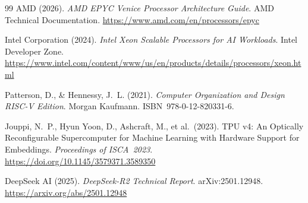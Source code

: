 ﻿\documentclass[a4paper,12pt]{article}
\theoremstyle{definition}
\begin{document}
\begin{thebibliography}{99}
AMD (2026).
\textit{AMD EPYC Venice Processor Architecture Guide}.
AMD Technical Documentation.
\url{https://www.amd.com/en/processors/epyc}

Intel Corporation (2024).
\textit{Intel Xeon Scalable Processors for AI Workloads}.
Intel Developer Zone.
\url{https://www.intel.com/content/www/us/en/products/details/processors/xeon.html}

Patterson, D., \& Hennessy, J.~L. (2021).
\textit{Computer Organization and Design RISC-V Edition}.
Morgan Kaufmann. ISBN~978-0-12-820331-6.

Jouppi, N.~P., Hyun Yoon, D., Ashcraft, M., et al.\ (2023).
TPU v4: An Optically Reconfigurable Supercomputer for Machine Learning
with Hardware Support for Embeddings.
\textit{Proceedings of ISCA~2023}.
\url{https://doi.org/10.1145/3579371.3589350}

DeepSeek AI (2025).
\textit{DeepSeek-R2 Technical Report}.
arXiv:2501.12948.
\url{https://arxiv.org/abs/2501.12948}

\end{thebibliography}
\end{document}
